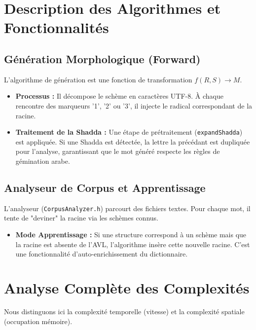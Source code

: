 \documentclass[12pt,a4paper]{article}
\begin{document}
\section{Description des Algorithmes et Fonctionnalités}

\subsection{Génération Morphologique (Forward)}
L'algorithme de génération est une fonction de transformation $f(R, S) \rightarrow M$.
\begin{itemize}
	\item \textbf{Processus :} Il décompose le schème en caractères UTF-8. À chaque rencontre des marqueurs '1', '2' ou '3', il injecte le radical correspondant de la racine.
	\item \textbf{Traitement de la Shadda :} Une étape de prétraitement (\texttt{expandShadda}) est appliquée. Si une Shadda est détectée, la lettre la précédant est dupliquée pour l'analyse, garantissant que le mot généré respecte les règles de gémination arabe.
\end{itemize}

\subsection{Analyseur de Corpus et Apprentissage}
L'analyseur (\texttt{CorpusAnalyzer.h}) parcourt des fichiers textes. Pour chaque mot, il tente de "deviner" la racine via les schèmes connus.
\begin{itemize}
	\item \textbf{Mode Apprentissage :} Si une structure correspond à un schème mais que la racine est absente de l'AVL, l'algorithme insère cette nouvelle racine. C'est une fonctionnalité d'auto-enrichissement du dictionnaire.
\end{itemize}

\section{Analyse Complète des Complexités}

Nous distinguons ici la complexité temporelle (vitesse) et la complexité spatiale (occupation mémoire).
\end{document}
